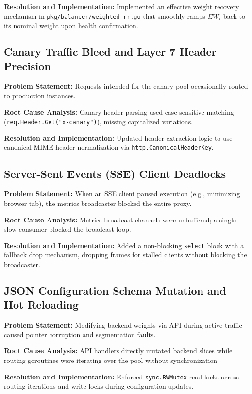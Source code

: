 \documentclass[12pt,openany]{report}
\begin{document}
\textbf{Resolution and Implementation:} Implemented an effective weight recovery mechanism in \texttt{pkg/balancer/weighted\_rr.go} that smoothly ramps $EW_i$ back to its nominal weight upon health confirmation.

\subsection{Canary Traffic Bleed and Layer 7 Header Precision}
\textbf{Problem Statement:} Requests intended for the canary pool occasionally routed to production instances.

\textbf{Root Cause Analysis:} Canary header parsing used case-sensitive matching (\texttt{req.Header.Get("x-canary")}), missing capitalized variations.

\textbf{Resolution and Implementation:} Updated header extraction logic to use canonical MIME header normalization via \texttt{http.CanonicalHeaderKey}.

\subsection{Server-Sent Events (SSE) Client Deadlocks}
\textbf{Problem Statement:} When an SSE client paused execution (e.g., minimizing browser tab), the metrics broadcaster blocked the entire proxy.

\textbf{Root Cause Analysis:} Metrics broadcast channels were unbuffered; a single slow consumer blocked the broadcast loop.

\textbf{Resolution and Implementation:} Added a non-blocking \texttt{select} block with a fallback drop mechanism, dropping frames for stalled clients without blocking the broadcaster.

\subsection{JSON Configuration Schema Mutation and Hot Reloading}
\textbf{Problem Statement:} Modifying backend weights via API during active traffic caused pointer corruption and segmentation faults.

\textbf{Root Cause Analysis:} API handlers directly mutated backend slices while routing goroutines were iterating over the pool without synchronization.

\textbf{Resolution and Implementation:} Enforced \texttt{sync.RWMutex} read locks across routing iterations and write locks during configuration updates.
\end{document}
